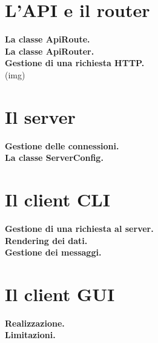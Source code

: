 \documentclass[a4paper,8pt]{article} %
\begin{document}
\begin{flushleft}
    \section{L'API e il router}

    \textbf{La classe ApiRoute.}\quad \\
    \textbf{La classe ApiRouter.}\quad \\
    \textbf{Gestione di una richiesta HTTP.}\quad \\
    (img)\\

    \section{Il server}

    \textbf{Gestione delle connessioni.}\quad \\
    \textbf{La classe ServerConfig.}\quad \\

    \section{Il client CLI}

    \textbf{Gestione di una richiesta al server.}\quad \\
    \textbf{Rendering dei dati.}\quad \\
    \textbf{Gestione dei messaggi.}\quad \\

    \section{Il client GUI}

    \textbf{Realizzazione.}\quad \\
    \textbf{Limitazioni.}\quad \\


\end{flushleft}
\end{document}
